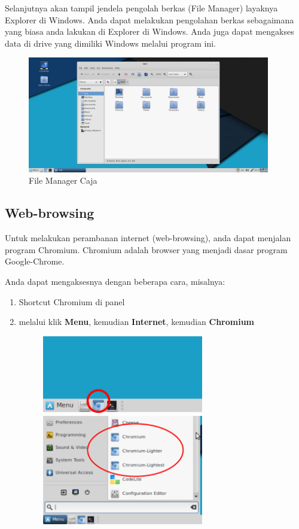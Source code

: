\documentclass[12pt,]{article}
\begin{document}
	Selanjutnya akan tampil jendela pengolah berkas (File Manager) layaknya Explorer di Windows.
	Anda dapat melakukan pengolahan berkas sebagaimana yang biasa anda lakukan di Explorer di Windows.
	Anda juga dapat mengakses data di drive yang dimiliki Windows melalui program ini.
	\begin{figure}[!ht]
		\centering
		\includegraphics[width=300pt]{png/caja}
		\caption{File Manager Caja}
	\end{figure}

	\newpage

	\subsection{Web-browsing}

	Untuk melakukan perambanan internet (web-browsing), anda dapat menjalan program Chromium.
	Chromium adalah browser yang menjadi dasar program Google-Chrome.

	Anda dapat mengaksesnya dengan beberapa cara, misalnya:

	\begin{enumerate}
		\item Shortcut Chromium di panel
		\item melalui klik \textbf{Menu}, kemudian \textbf{Internet}, kemudian \textbf{Chromium} 
		\begin{figure}[!ht]
			\centering
			\includegraphics[width=200pt]{png/panelchromium}
			\includegraphics[width=200pt]{png/menuchromium}
		\end{figure}
	\end{enumerate}
\end{document}
